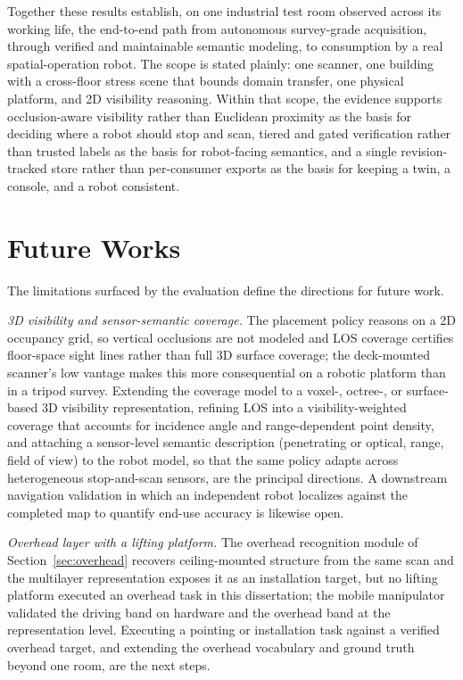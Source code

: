 Together these results establish, on one industrial test room observed across
its working life, the end-to-end path from autonomous survey-grade acquisition,
through verified and maintainable semantic modeling, to consumption by a real
spatial-operation robot. The scope is stated plainly: one scanner, one
building with a cross-floor stress scene that bounds domain transfer, one
physical platform, and 2D visibility reasoning. Within that scope, the
evidence supports occlusion-aware visibility rather than Euclidean proximity as
the basis for deciding where a robot should stop and scan, tiered and gated
verification rather than trusted labels as the basis for robot-facing
semantics, and a single revision-tracked store rather than per-consumer exports
as the basis for keeping a twin, a console, and a robot consistent.

\section{Future Works}
\label{sec:future}

The limitations surfaced by the evaluation define the directions for future
work.

\emph{3D visibility and sensor-semantic coverage.} The placement policy
reasons on a 2D occupancy grid, so vertical occlusions are not modeled and
LOS coverage certifies floor-space sight lines rather than full 3D surface
coverage; the deck-mounted scanner's low vantage makes this more consequential
on a robotic platform than in a tripod survey. Extending the coverage model to
a voxel-, octree-, or surface-based 3D visibility representation, refining LOS
into a visibility-weighted coverage that accounts for incidence angle and
range-dependent point density, and attaching a sensor-level semantic
description (penetrating or optical, range, field of view) to the robot model,
so that the same policy adapts across heterogeneous stop-and-scan sensors, are
the principal directions. A downstream navigation validation in which an
independent robot localizes against the completed map to quantify end-use
accuracy is likewise open.

\emph{Overhead layer with a lifting platform.} The overhead recognition
module of Section~\ref{sec:overhead} recovers ceiling-mounted structure from
the same scan and the multilayer representation exposes it as an installation
target, but no lifting platform executed an overhead task in this
dissertation; the mobile manipulator validated the driving band on hardware
and the overhead band at the representation level. Executing a pointing or
installation task against a verified overhead target, and extending the
overhead vocabulary and ground truth beyond one room, are the next steps.

